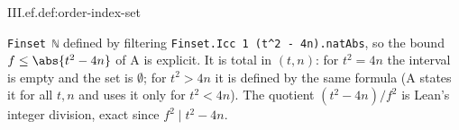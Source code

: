 \begin{definition}
\end{definition}
\begin{tfformal}{III.ef.def:order-index-set}
\begin{tffidelity}
\texttt{Finset ℕ} defined by filtering \texttt{Finset.Icc 1 (t\^{}2 - 4n).natAbs}, so the bound $f\le\abs{t^2-4n}$ of A is explicit. It is total in $(t,n)$: for $t^2=4n$ the interval is empty and the set is $\emptyset$; for $t^2>4n$ it is defined by the same formula (A states it for all $t,n$ and uses it only for $t^2<4n$). The quotient $(t^2-4n)/f^2$ is Lean's integer division, exact since $f^2\mid t^2-4n$.
\end{tffidelity}
\end{tfformal}

